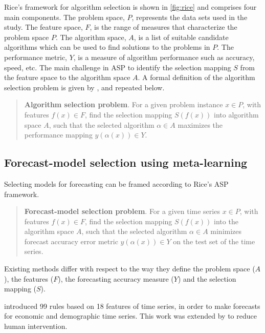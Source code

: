 \documentclass[11pt,a4paper,]{article}
\begin{document}
Rice's framework for algorithm selection is shown in \autoref{fig:rice} and comprises four main components. The problem space, \(P\), represents the data sets used in the study. The feature space, \(F\), is the range of measures that characterize the problem space \(P\). The algorithm space, \(A\), is a list of suitable candidate algorithms which can be used to find solutions to the problems in \(P\). The performance metric, \(Y\), is a measure of algorithm performance such as accuracy, speed, etc. The main challenge in ASP to identify the selection mapping \(S\) from the feature space to the algorithm space \(A\). A formal definition of the algorithm selection problem is given by \textcite{smith2009cross}, and repeated below.

\begin{quote}
\textbf{Algorithm selection problem}. For a given problem instance \(x \in P\), with features \(f(x) \in F\), find the selection mapping \(S(f(x))\) into algorithm space \(A\), such that the selected algorithm \(\alpha \in A\) maximizes the performance mapping \(y(\alpha(x)) \in Y\).
\end{quote}

\hypertarget{forecast-model-selection-using-meta-learning}{%
\subsection{Forecast-model selection using meta-learning}\label{forecast-model-selection-using-meta-learning}}

Selecting models for forecasting can be framed according to Rice's ASP framework.

\begin{quote}
\textbf{Forecast-model selection problem}. For a given time series \(x \in P\), with features \(f(x) \in F\), find the selection mapping \(S(f(x))\) into the algorithm space \(A\), such that the selected algorithm \(\alpha \in A\) minimizes forecast accuracy error metric \(y(\alpha(x)) \in Y\) on the test set of the time series.
\end{quote}

Existing methods differ with respect to the way they define the problem space (\(A\)), the features (\(F\)), the forecasting accuracy measure (\(Y\)) and the selection mapping (\(S\)).

\textcite{collopy1992rule} introduced 99 rules based on 18 features of time series, in order to make forecasts for economic and demographic time series. This work was extended by \textcite{armstrong2001s} to reduce human intervention.
\end{document}
